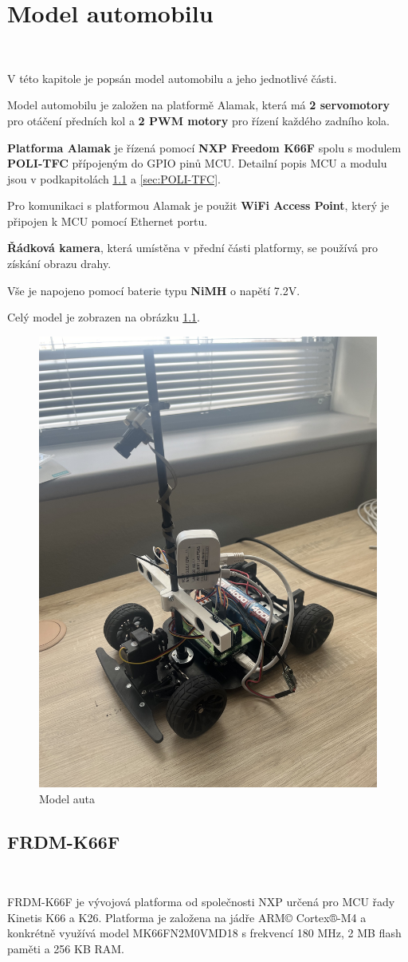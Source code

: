 \chapter{Model automobilu}
\label{sec:CarModel}\

V této kapitole je popsán model automobilu a jeho jednotlivé části.

Model automobilu je založen na platformě Alamak, která má
\textbf{2 servomotory} pro otáčení předních kol a
\textbf{2 PWM motory} pro řízení každého
zadního kola.

\textbf{Platforma Alamak} je řízená pomocí \textbf{NXP Freedom K66F}\cite{frdmk66UserGuide} spolu
s modulem \textbf{POLI-TFC} přípojeným do GPIO pinů MCU.
Detailní popis MCU a modulu jsou v podkapitolách \ref{sec:FRDM-K66F}
a \ref{sec:POLI-TFC}.

Pro komunikaci s platformou Alamak je použit \textbf{WiFi Access Point}, který je připojen k MCU
pomocí Ethernet portu.

\textbf{Řádková kamera}, která umístěna v přední části platformy,
se používá pro získání obrazu drahy.

Vše je napojeno pomocí baterie typu \textbf{NiMH} o napětí 7.2V.

Celý model je zobrazen na obrázku \ref{fig:car}.
\begin{figure}[h]
    \centering
    \includegraphics[width=0.45\linewidth, angle=-90]{Figures/car.jpeg}
    \caption{Model auta}
    \label{fig:car}
\end{figure}

\section{FRDM-K66F}
\label{sec:FRDM-K66F}\

FRDM-K66F je vývojová platforma od společnosti NXP určená pro MCU řady Kinetis K66 a K26.
Platforma je založena na jádře ARM© Cortex®-M4 a
konkrétně využívá model MK66FN2M0VMD18 s frekvencí 180 MHz, 2 MB flash paměti a 256 KB RAM.

